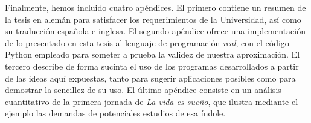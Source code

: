 Finalmente, hemos incluido cuatro apéndices. El primero contiene un resumen de la tesis en alemán para satisfacer los requerimientos de la Universidad, así como su traducción española e inglesa. El segundo apéndice ofrece una implementación de lo presentado en esta tesis al lenguaje de programación \textit{real}, con el código Python empleado para someter a prueba la validez de nuestra aproximación. El tercero describe de forma sucinta el uso de los programas desarrollados a partir de las ideas aquí expuestas, tanto para sugerir aplicaciones posibles como para demostrar la sencillez de su uso. El último apéndice consiste en un análisis cuantitativo de la primera jornada de \textit{La vida es sueño}, que ilustra mediante el ejemplo las demandas de potenciales estudios de esa índole.
